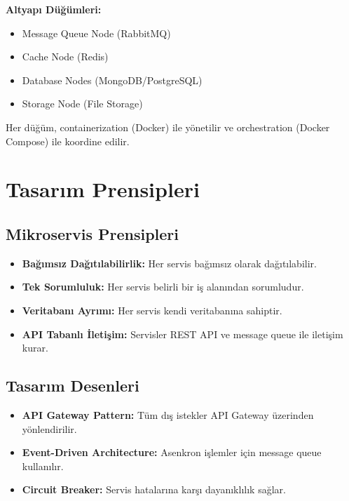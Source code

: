 \textbf{Altyapı Düğümleri:}
\begin{itemize}
    \item Message Queue Node (RabbitMQ)
    \item Cache Node (Redis)
    \item Database Nodes (MongoDB/PostgreSQL)
    \item Storage Node (File Storage)
\end{itemize}

Her düğüm, containerization (Docker) ile yönetilir ve orchestration (Docker Compose) ile koordine edilir.

\section{Tasarım Prensipleri}

\subsection{Mikroservis Prensipleri}
\begin{itemize}
    \item \textbf{Bağımsız Dağıtılabilirlik:} Her servis bağımsız olarak dağıtılabilir.
    \item \textbf{Tek Sorumluluk:} Her servis belirli bir iş alanından sorumludur.
    \item \textbf{Veritabanı Ayrımı:} Her servis kendi veritabanına sahiptir.
    \item \textbf{API Tabanlı İletişim:} Servisler REST API ve message queue ile iletişim kurar.
\end{itemize}

\subsection{Tasarım Desenleri}
\begin{itemize}
    \item \textbf{API Gateway Pattern:} Tüm dış istekler API Gateway üzerinden yönlendirilir.
    \item \textbf{Event-Driven Architecture:} Asenkron işlemler için message queue kullanılır.
    \item \textbf{Circuit Breaker:} Servis hatalarına karşı dayanıklılık sağlar.
\end{itemize}
